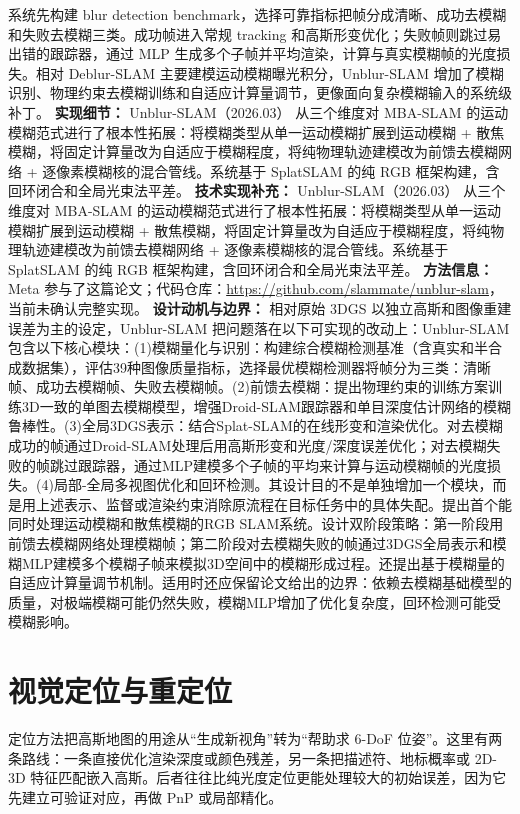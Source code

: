 系统先构建 blur detection benchmark，选择可靠指标把帧分成清晰、成功去模糊和失败去模糊三类。成功帧进入常规 tracking 和高斯形变优化；失败帧则跳过易出错的跟踪器，通过 MLP 生成多个子帧并平均渲染，计算与真实模糊帧的光度损失。相对 Deblur-SLAM 主要建模运动模糊曝光积分，Unblur-SLAM 增加了模糊识别、物理约束去模糊训练和自适应计算量调节，更像面向复杂模糊输入的系统级补丁。
\textbf{实现细节：} Unblur-SLAM（2026.03） 从三个维度对 MBA-SLAM 的运动模糊范式进行了根本性拓展：将模糊类型从单一运动模糊扩展到运动模糊 + 散焦模糊，将固定计算量改为自适应于模糊程度，将纯物理轨迹建模改为前馈去模糊网络 + 逐像素模糊核的混合管线。系统基于 SplatSLAM 的纯 RGB 框架构建，含回环闭合和全局光束法平差。
\textbf{技术实现补充：} Unblur-SLAM（2026.03） 从三个维度对 MBA-SLAM 的运动模糊范式进行了根本性拓展：将模糊类型从单一运动模糊扩展到运动模糊 + 散焦模糊，将固定计算量改为自适应于模糊程度，将纯物理轨迹建模改为前馈去模糊网络 + 逐像素模糊核的混合管线。系统基于 SplatSLAM 的纯 RGB 框架构建，含回环闭合和全局光束法平差。
\textbf{方法信息：} Meta 参与了这篇论文；代码仓库：\url{https://github.com/slammate/unblur-slam}，当前未确认完整实现。
\textbf{设计动机与边界：} 相对原始 3DGS 以独立高斯和图像重建误差为主的设定，Unblur-SLAM 把问题落在以下可实现的改动上：Unblur-SLAM包含以下核心模块：(1)模糊量化与识别：构建综合模糊检测基准（含真实和半合成数据集），评估39种图像质量指标，选择最优模糊检测器将帧分为三类：清晰帧、成功去模糊帧、失败去模糊帧。(2)前馈去模糊：提出物理约束的训练方案训练3D一致的单图去模糊模型，增强Droid-SLAM跟踪器和单目深度估计网络的模糊鲁棒性。(3)全局3DGS表示：结合Splat-SLAM的在线形变和渲染优化。对去模糊成功的帧通过Droid-SLAM处理后用高斯形变和光度/深度误差优化；对去模糊失败的帧跳过跟踪器，通过MLP建模多个子帧的平均来计算与运动模糊帧的光度损失。(4)局部-全局多视图优化和回环检测。其设计目的不是单独增加一个模块，而是用上述表示、监督或渲染约束消除原流程在目标任务中的具体失配。提出首个能同时处理运动模糊和散焦模糊的RGB SLAM系统。设计双阶段策略：第一阶段用前馈去模糊网络处理模糊帧；第二阶段对去模糊失败的帧通过3DGS全局表示和模糊MLP建模多个模糊子帧来模拟3D空间中的模糊形成过程。还提出基于模糊量的自适应计算量调节机制。适用时还应保留论文给出的边界：依赖去模糊基础模型的质量，对极端模糊可能仍然失败，模糊MLP增加了优化复杂度，回环检测可能受模糊影响。

\section{视觉定位与重定位}

定位方法把高斯地图的用途从“生成新视角”转为“帮助求 6-DoF 位姿”。这里有两条路线：一条直接优化渲染深度或颜色残差，另一条把描述符、地标概率或 2D-3D 特征匹配嵌入高斯。后者往往比纯光度定位更能处理较大的初始误差，因为它先建立可验证对应，再做 PnP 或局部精化。
